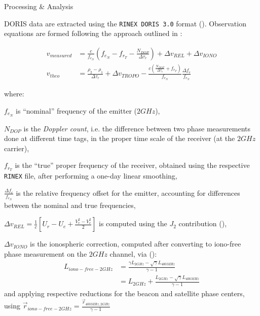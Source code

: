 \documentclass[final,a0,portrait]{beamer}
\newlength{\onecolwid}
\begin{document}
\begin{frame}[t]
\begin{columns}[t]
\begin{column}{\onecolwid}
\begin{block}{Processing \& Analysis}

{\small
DORIS data are extracted using the \texttt{RINEX DORIS 3.0} format 
(\cite{DORISRNX3}). Observation equations are formed following the approach 
outlined in \cite{lemoine-2016}:

\begin{subequations} \label{eq:lem13}
    \begin{align}
        v_{measured} & = \frac{c}{f_{e_N}} (f_{e_N} - f_{r_T} -
          \frac{N_{DOP}}{\Delta\tau_r}) + \Delta v_{REL} + 
          \Delta v_{IONO} \label{eq:lem13a} \\
        v_{theo} &= \frac{\rho_2 - \rho_1}{\Delta\tau_r} +
          \Delta v_{TROPO} - \frac{c(\frac{N_{DOP}}{\Delta\tau_r} + 
          f_{r_T})}{f_{e_N}} \frac{\Delta f_e}{f_{e_N}} \label{eq:lem13b}
    \end{align}
\end{subequations}

where:

\begin{description}
  \item $f_{e_N}$ is ``nominal'' frequency of the emitter ($2GHz$),
%
  \item $N_{DOP}$ is the \emph{Doppler count}, i.e. the difference between two 
  phase measurements done at diﬀerent time tags, in the proper time scale of 
  the receiver (at the $2GHz$ carrier),
%
  \item $f_{r_T}$ is the ``true'' proper frequency of the receiver, obtained 
  using the respective \texttt{RINEX} file, after performing a one-day linear 
  smoothing,
%
  \item $\frac{\Delta f_e}{f_{e_N}}$ is the relative frequency offset for the 
  emitter, accounting for differences between the nominal and true frequencies,
%
  \item $\Delta v_{REL} = \frac{1}{c} \left[ U_{r} - U_{e} + \frac{V^2_r - V^2_e}{2} \right]$ is computed using the $J_2$ contribution (\cite{lemoine-2016}),
%
  \item $\Delta v_{IONO}$ is the ionospheric correction, computed after 
  converting to iono-free phase measurement on the $2GHz$ channel, via 
  (\cite{lemoine-2016}):
  \begin{equation}
    \begin{aligned}
      L_{iono-free-2GHz} &= \frac{\gamma L_{2GHz} -
          \sqrt{\gamma}L_{400MHz}}{\gamma - 1} \\
                     &= L_{2GHz} + \frac{L_{2GHz} -
                        \sqrt{\gamma}L_{400MHz}}{\gamma - 1}
    \end{aligned}
  \end{equation}
  and applying respective reductions for the beacon and satellite phase centers, 
  using $\vec{r}_{iono-free-2GHz} = \frac{\vec{r}_{400MHz,2GHz}}{\gamma - 1}$


\end{description}}
\end{block}
\end{column}
\end{columns}
\end{frame}
\end{document}
